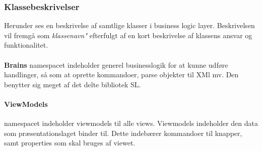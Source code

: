 \subsubsection{Klassebeskrivelser}

Herunder ses en  beskrivelse af samtlige klasser i business logic layer. Beskrivelsen vil fremgå som \textit{klassenavn"} efterfulgt af en kort beskrivelse af klassens ansvar og funktionalitet.\\\\


\textbf{Brains} namespacet indeholder generel businesslogik for at kunne udføre handlinger, så som at oprette kommandoer, parse objekter til XMl mv. Den benytter sig meget af det delte bibliotek \gls{SL}.\\

\paragraph{ViewModels} namespacet indeholder viewmodels til alle views. Viewmodels indeholder den data som præsentationslaget binder til. Dette indebærer kommandoer til knapper, samt properties som skal bruges af viewet.\\

